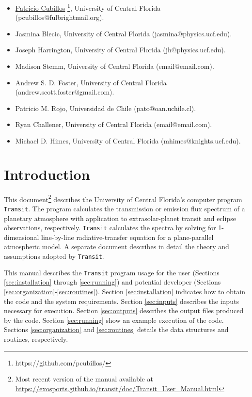 \documentclass[letterpaper, 12pt]{article}
\begin{document}
\begin{itemize}
\item \href{https://github.com/pcubillos/}{Patricio Cubillos}%
  \footnote{https://github.com/pcubillos/}, University of
  Central Florida (pcubillos@fulbrightmail.org).
\item Jasmina Blecic, University of Central Florida (jasmina@physics.ucf.edu).
\item Joseph Harrington, University of Central Florida (jh@physics.ucf.edu).
\item Madison Stemm, University of Central Florida (email@email.com).
\item Andrew S. D. Foster, University of Central Florida (andrew.scott.foster@gmail.com).
\item Patricio M. Rojo, Universidad de Chile (pato@oan.uchile.cl).
\item Ryan Challener, University of Central Florida (email@email.com).
\item Michael D. Himes, University of Central Florida (mhimes@knights.ucf.edu).
\end{itemize}

\section{Introduction}
\label{sec:intro}

This document\footnote{Most recent version of the manual available at 
\href{https://exosports.github.io/transit/doc/Transit_User_Manual.html}{https://exosports.github.io/transit/doc/Transit\_User\_Manual.html}} 
describes the University of Central Florida's computer
program {\tt Transit}.  The program calculates the transmission or
emission flux spectrum of a planetary atmosphere with
application to extrasolar-planet transit and eclipse observations,
respectively.  {\tt Transit} calculates the spectra by solving for
1-dimensional line-by-line radiative-transfer equation for a
plane-parallel atmospheric model.  A separate document  describes in detail the theory and assumptions adopted by
{\tt Transit}.

This manual describes the {\tt Transit} program usage for the user
(Sections \ref{sec:installation} through \ref{sec:running}) and
potential developer (Sections
\ref{sec:organization}-\ref{sec:routines}).  Section
\ref{sec:installation} indicates how to obtain the code and the system
requirements.  Section \ref{sec:inputs} describes the inputs necessary
for execution.  Section \ref{sec:outputs} describes the output files
produced by the code. Section \ref{sec:running} show an example
execution of the code.  
Sections \ref{sec:organization} and \ref{sec:routines} details the data
structures and routines, respectively.
\end{document}
